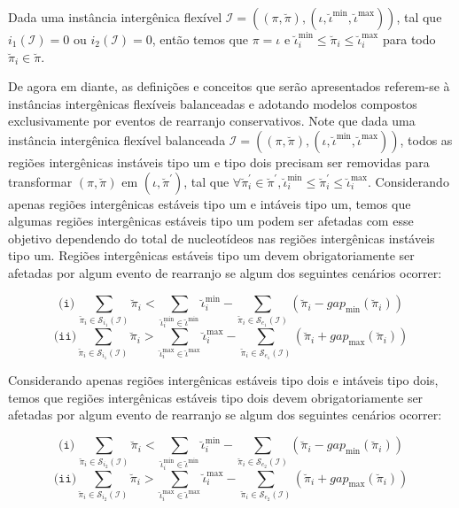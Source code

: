 \begin{remark}\label{remark:EUSNDMWS}
Dada uma instância intergênica flexível $\mathcal{I} = ((\pi,\breve\pi),(\iota,\breve\iota^{\min},\breve\iota^{\max}))$, tal que $i_1(\mathcal{I}) = 0 $ ou $ i_2(\mathcal{I}) = 0$, então temos que $\pi = \iota$ e $\breve\iota^{\min}_i \le \breve\pi_i \le \breve\iota^{\max}_i$ para todo $\breve\pi_i \in \breve\pi$.
\end{remark}

De agora em diante, as definições e conceitos que serão apresentados referem-se à instâncias intergênicas flexíveis balanceadas e adotando modelos compostos exclusivamente por eventos de rearranjo conservativos. Note que dada uma instância intergênica flexível balanceada $\mathcal{I} = ((\pi,\breve\pi),(\iota,\breve\iota^{\min},\breve\iota^{\max}))$, todos as regiões intergênicas instáveis tipo um e tipo dois precisam ser removidas para transformar $(\pi,\breve\pi)$ em $(\iota,\breve\pi^{\prime})$, tal que $\forall \breve\pi^{\prime}_i \in \breve\pi^{\prime}, \breve\iota^{\min}_i \le \breve\pi^{\prime}_i \le \breve\iota^{\max}_i$. Considerando apenas regiões intergênicas estáveis tipo um e intáveis tipo um, temos que algumas regiões intergênicas estáveis tipo um podem ser afetadas com esse objetivo dependendo do total de nucleotídeos nas regiões intergênicas instáveis tipo um. Regiões intergênicas estáveis tipo um devem obrigatoriamente ser afetadas por algum evento de rearranjo se algum dos seguintes cenários ocorrer:

$$\texttt{(i)}~\sum_{\breve\pi_i \in \mathcal{S}_{i_{1}}(\mathcal{I})} \breve\pi_i < \sum_{\breve\iota_{i}^{\min}  \in \breve\iota^{\min}} \breve\iota_{i}^{\min} - \sum_{\breve\pi_i \in \mathcal{S}_{e_{1}}(\mathcal{I})} (\breve\pi_i - gap_{\min}(\breve\pi_i))$$
$$\texttt{(ii)}\sum_{\breve\pi_i \in \mathcal{S}_{i_{1}}(\mathcal{I})} \breve\pi_i > \sum_{\breve\iota_{i}^{\max}  \in \breve\iota^{\max}} \breve\iota_{i}^{\max} - \sum_{\breve\pi_i \in \mathcal{S}_{e_{1}}(\mathcal{I})} (\breve\pi_i + gap_{\max}(\breve\pi_i))$$

Considerando apenas regiões intergênicas estáveis tipo dois e intáveis tipo dois, temos que regiões intergênicas estáveis tipo dois devem obrigatoriamente ser afetadas por algum evento de rearranjo se algum dos seguintes cenários ocorrer:

$$\texttt{(i)}~\sum_{\breve\pi_i \in \mathcal{S}_{i_{2}}(\mathcal{I})} \breve\pi_i < \sum_{\breve\iota_{i}^{\min}  \in \breve\iota^{\min}} \breve\iota_{i}^{\min} - \sum_{\breve\pi_i \in \mathcal{S}_{e_{2}}(\mathcal{I})} (\breve\pi_i - gap_{\min}(\breve\pi_i))$$
$$\texttt{(ii)}\sum_{\breve\pi_i \in \mathcal{S}_{i_{2}}(\mathcal{I})} \breve\pi_i > \sum_{\breve\iota_{i}^{\max}  \in \breve\iota^{\max}} \breve\iota_{i}^{\max} - \sum_{\breve\pi_i \in \mathcal{S}_{e_{2}}(\mathcal{I})} (\breve\pi_i + gap_{\max}(\breve\pi_i))$$


